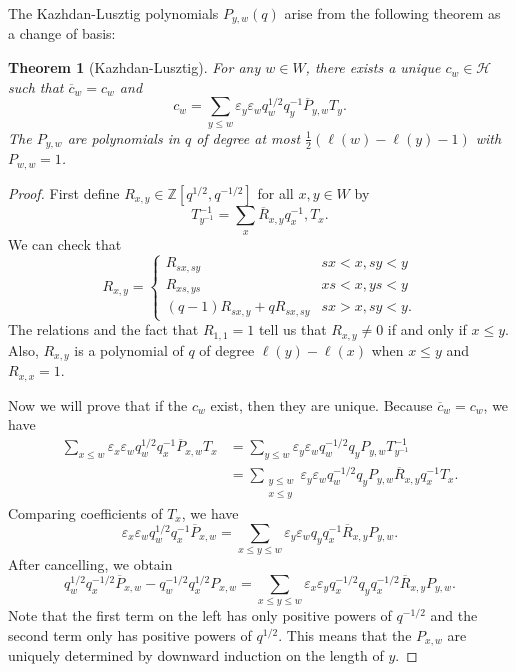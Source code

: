 \documentclass[leqno, openany]{memoir}
\newtheorem{thm}{Theorem}[section]
\theoremstyle{definition}
\theoremstyle{remark}
\theoremstyle{plain}
\theoremstyle{definition}
\theoremstyle{remark}
\newcommand{\Z}{\mathbb{Z}}
\newcommand{\ep}{\varepsilon}
\newcommand{\mc}[1]{\mathcal{#1}}
\newcommand{\ol}[1]{\overline{#1}}
\begin{document}
The Kazhdan-Lusztig polynomials $P_{y, w}(q)$ arise from the following theorem as a change of basis:
\begin{thm}[Kazhdan-Lusztig]
    For any $w \in W$, there exists a unique $c_w \in \mc{H}$ such that $\ol{c}_w = c_w$ and
    \[ c_w = \sum_{y \leq w} \ep_y \ep_w q_w^{1/2} q_y^{-1} \ol{P}_{y,w} T_y. \]
    The $P_{y,w}$ are polynomials in $q$ of degree at most $\frac{1}{2} (\ell(w) - \ell(y) - 1)$ with $P_{w,w} = 1$.
\end{thm}

\begin{proof}
    First define $R_{x,y} \in \Z[q^{1/2}, q^{-1/2}]$ for all $x,y \in W$ by
    \[ T_{y^{-1}}^{-1} = \sum_x \ol{R}_{x,y} q_x^{-1}, T_x. \]
    We can check that 
    \[ R_{x,y} = \begin{cases}
        R_{sx, sy} & sx < x, sy < y \\
        R_{xs, ys} & xs < x, ys < y \\
        (q-1) R_{sx,y} + q R_{sx,sy} & sx > x, sy < y.
    \end{cases}
    \]
    The relations and the fact that $R_{1,1} = 1$ tell us that $R_{x,y} \neq 0$ if and only if $x \leq y$. Also, $R_{x,y}$ is a polynomial of $q$ of degree $\ell(y) - \ell(x)$ when $x \leq y$ and $R_{x,x} = 1$.

    Now we will prove that if the $c_w$ exist, then they are unique. Because $\ol{c}_w = c_w$, we have
    \begin{align*} 
        \sum_{x \leq w} \ep_x \ep_w q_w^{1/2} q_x^{-1} \ol{P}_{x,w} T_x &= \sum_{y \leq w} \ep_y \ep_w q_w^{-1/2} q_y P_{y,w} T_{y^{-1}}^{-1} \\
        &= \sum_{\substack{y \leq w \\ x \leq y}} \ep_y \ep_w q_w^{-1/2} q_y P_{y,w} \ol{R}_{x,y} q_x^{-1} T_x.
    \end{align*}
    Comparing coefficients of $T_x$, we have
    \[ \ep_x \ep_w q_w^{1/2} q_x^{-1} \ol{P}_{x,w} = \sum_{x \leq y \leq w} \ep_y \ep_w q_y q_x^{-1} \ol{R}_{x,y} P_{y,w}. \]
    After cancelling, we obtain
    \[ q_w^{1/2} q_x^{-1/2} \ol{P}_{x,w} - q_w^{-1/2} q_x^{1/2} P_{x,w} = \sum_{x \leq y \leq w} \ep_x \ep_y q_x^{-1/2} q_y q_x^{-1/2} \ol{R}_{x,y} P_{y,w}. \]
    Note that the first term on the left has only positive powers of $q^{-1/2}$ and the second term only has positive powers of $q^{1/2}$. This means that the $P_{x,w}$ are uniquely determined by downward induction on the length of $y$.


\end{proof}
\end{document}
